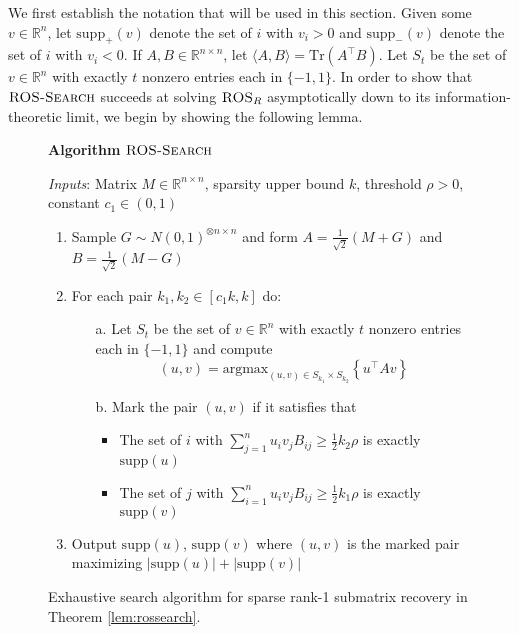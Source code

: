We first establish the notation that will be used in this section. Given some $v \in \mathbb{R}^n$, let $\text{supp}_+(v)$ denote the set of $i$ with $v_i > 0$ and $\text{supp}_-(v)$ denote the set of $i$ with $v_i < 0$. If $A, B \in \mathbb{R}^{n \times n}$, let $\langle A, B \rangle = \text{Tr}(A^\top B)$. Let $S_t$ be the set of $v \in \mathbb{R}^n$ with exactly $t$ nonzero entries each in $\{-1, 1\}$. In order to show that $\textsc{ROS-Search}$ succeeds at solving $\textsc{ROS}_R$ asymptotically down to its information-theoretic limit, we begin by showing the following lemma.

\begin{figure}[t!]
\begin{algbox}
\textbf{Algorithm} $\textsc{ROS-Search}$
\vspace{2mm}

\textit{Inputs}: Matrix $M \in \mathbb{R}^{n \times n}$, sparsity upper bound $k$, threshold $\rho > 0$, constant $c_1 \in (0, 1)$
\begin{enumerate}
\item Sample $G \sim N(0, 1)^{\otimes n \times n}$ and form $A = \frac{1}{\sqrt{2}} (M + G)$ and $B = \frac{1}{\sqrt{2}} (M - G)$
\item For each pair $k_1, k_2 \in [c_1 k, k]$ do:
\begin{enumerate}
\item[a.] Let $S_t$ be the set of $v \in \mathbb{R}^n$ with exactly $t$ nonzero entries each in $\{-1, 1\}$ and compute 
$$(u, v) = \text{argmax}_{(u, v) \in S_{k_1} \times S_{k_2}} \left\{ u^\top A v \right\}$$
\item[b.] Mark the pair $(u, v)$ if it satisfies that
\begin{itemize}
\item The set of $i$ with $\sum_{j = 1}^n u_i v_j B_{ij} \ge \frac{1}{2} k_2 \rho$ is exactly $\text{supp}(u)$
\item The set of $j$ with $\sum_{i = 1}^n u_i v_j B_{ij} \ge \frac{1}{2} k_1 \rho$ is exactly $\text{supp}(v)$
\end{itemize}
\end{enumerate}
\item Output $\text{supp}(u)$, $\text{supp}(v)$ where $(u, v)$ is the marked pair maximizing $|\text{supp}(u)| + |\text{supp}(v)|$
\end{enumerate}
\vspace{1mm}
\end{algbox}
\caption{Exhaustive search algorithm for sparse rank-1 submatrix recovery in Theorem \ref{lem:rossearch}.}
\end{figure}

